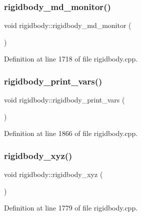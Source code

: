 \subsubsection{\texorpdfstring{rigidbody\+\_\+md\+\_\+monitor()}{rigidbody\_md\_monitor()}}
{\footnotesize\ttfamily void rigidbody\+::rigidbody\+\_\+md\+\_\+monitor (\begin{DoxyParamCaption}{ }\end{DoxyParamCaption})}



Definition at line 1718 of file rigidbody.\+cpp.

\mbox{\label{classrigidbody_ae7af1f93b40b47c9e855bcb0adb74434}} 
\subsubsection{\texorpdfstring{rigidbody\+\_\+print\+\_\+vars()}{rigidbody\_print\_vars()}}
{\footnotesize\ttfamily void rigidbody\+::rigidbody\+\_\+print\+\_\+vars (\begin{DoxyParamCaption}{ }\end{DoxyParamCaption})}



Definition at line 1866 of file rigidbody.\+cpp.

\mbox{\label{classrigidbody_a05123548826f40f3737bd9f0fce21a85}} 
\subsubsection{\texorpdfstring{rigidbody\+\_\+xyz()}{rigidbody\_xyz()}}
{\footnotesize\ttfamily void rigidbody\+::rigidbody\+\_\+xyz (\begin{DoxyParamCaption}{ }\end{DoxyParamCaption})}



Definition at line 1779 of file rigidbody.\+cpp.

\mbox{\label{classrigidbody_a8bb19f9f20480add2468b3b9376f7e7a}} 

